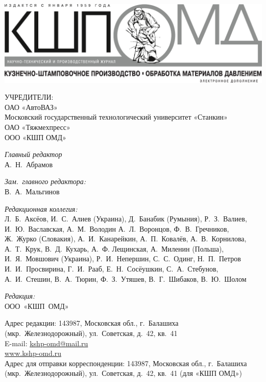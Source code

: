 
\pagestyle{empty}



\vspace{-1cm}
\noindent\includegraphics[width=\textwidth]{kshp-ru-el-logo}

\begin{center}
    \small
    УЧРЕДИТЕЛИ:\\
ОАО «АвтоВАЗ»\\
Московский государственный технологический университет «Станкин»\\
ОАО «Тяжмехпресс»\\
ООО «КШП ОМД»
\end{center}

\noindent
\begin{minipage}{.7\textwidth}
  \kshpPrintRuCont
\end{minipage}\hspace{0.05\textwidth}%
\begin{minipage}{.25\textwidth}
\begin{flushleft}
    \scriptsize

\textit{Главный редактор}\\
А. Н. Абрамов

\textit{Зам. главного редактора:}\\
В. А. Мальгинов

\textit{Редакционная коллегия:}\\
Л. Б. Аксёов, И. С. Алиев (Украина),
Д. Банабик (Румыния),
Р. З. Валиев, И. Ю. Ваславская, А. М. Володин
А. Л. Воронцов, Ф. В. Гречников,
Ж. Журко (Словакия), А. И. Канарейкин,
А. П. Ковалёв, А. В. Корнилова, А. Т. Крук,
В. Д. Кухарь, А. Ф. Лещинская, А. Миленин
(Польша), И. Я. Мовшович (Украина),
Р. И. Непершин, С. С. Одинг, Н. П. Петров
И. И. Просвирина, Г. И. Рааб, Е. Н. Сосёушкин, С. А. Стебунов, А. И. Стешин,
В. А. Тюрин, Ф. З. Утяшев, В. Г. Шибаков,
В. Ю. Шолом

\vspace{.3cm}
\textit{Редакция:}\\
ООО «КШП ОМД»

Адрес редакции: 143987, Московская обл., г. Балашиха (мкр. Железнодорожный), ул. Советская, д. 42, кв. 41\\
E-mail: \href{mailto:kshp-omd@mail.ru}{kshp-omd@mail.ru}\\
\href{https://kshp-omd.ru/}{www.kshp-omd.ru}\\
Адрес для отправки корреспонденции: 143987, Московская обл., г. Балашиха (мкр. Железнодорожный), ул. Советская, д. 42, кв. 41 (для «КШП ОМД»)
\end{flushleft}
\end{minipage}

